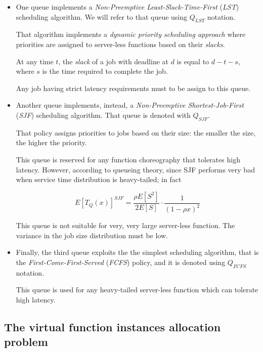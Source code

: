 \documentclass[10pt,a4paper]{article}
\theoremstyle{definition}
\begin{document}
\begin{itemize}

\item One queue implements a \textit{Non-Preemptive Least-Slack-Time-First} (\textit{LST}) scheduling algorithm. We will refer to that queue using $Q_{LST}$ notation.

That algorithm implements a \textit{dynamic priority scheduling approach} where priorities are assigned to server-less functions based on their \textit{slacks}.

At any time $t$, the \textit{slack} of a job with deadline at $d$ is equal to $d - t - s$, where $s$ is the time required to complete the job. 

Any job having strict latency requirements must to be assign to this queue.

\item Another queue implements, instead, a \textit{Non-Preemptive Shortest-Job-First} (\textit{SJF}) scheduling algorithm. That queue is denoted with $Q_{SJF}$.

That policy assigns priorities to jobs based on their size: the smaller the size, the higher the priority.

This queue is reserved for any function choreography that tolerates high latency. However, according to queueing theory, since SJF performs very bad when service time distribution is heavy-tailed; in fact

\begin{equation}
E[T_Q(x)]^{SJF} = \dfrac{\rho E[S^2]}{2E [S]} \cdot \dfrac{1}{(1 - \rho x )^2}
\end{equation}

This queue is not suitable for very, very large server-less function. The variance in the job size distribution must be low.

\item Finally, the third queue exploits the the simplest scheduling algorithm, that is the \textit{First-Come-First-Served} (\textit{FCFS}) policy, and it is denoted using $Q_{FCFS}$ notation.

This queue is used for any heavy-tailed server-less function which can tolerate high latency.
\end{itemize}

\subsection{The virtual function instances allocation problem}
\end{document}
